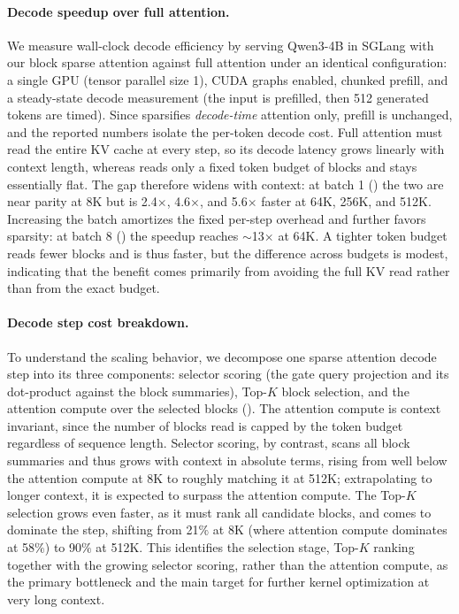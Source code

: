 \paragraph{Decode speedup over full attention.}
We measure wall-clock decode efficiency by serving Qwen3-4B in SGLang with
our block sparse attention against full attention under an identical
configuration: a single GPU (tensor parallel size 1), CUDA graphs enabled,
chunked prefill, and a steady-state decode measurement (the input is prefilled,
then 512 generated tokens are timed).
Since \our sparsifies \emph{decode-time} attention only, prefill is unchanged,
and the reported numbers isolate the per-token decode cost.
Full attention must read the entire KV cache at every step, so its decode
latency grows linearly with context length, whereas \our reads only a fixed
token budget of blocks and stays essentially flat.
The gap therefore widens with context: at batch 1
() the two are near parity at 8K but \our is
2.4$\times$, 4.6$\times$, and 5.6$\times$ faster at 64K, 256K, and 512K.
Increasing the batch amortizes the fixed per-step overhead and further favors
sparsity: at batch 8 () the speedup reaches
$\sim$13$\times$ at 64K.
A tighter token budget reads fewer blocks and is thus faster, but the difference
across budgets is modest, indicating that the benefit
comes primarily from avoiding the full KV read rather than from the exact budget.

\paragraph{Decode step cost breakdown.}
To understand the scaling behavior, we decompose one sparse attention decode
step into its three components: selector scoring (the gate query projection and
its dot-product against the block summaries), Top-$K$ block selection, and the
attention compute over the selected blocks ().
The attention compute is context invariant, since the number of blocks read is
capped by the token budget regardless of sequence length.
Selector scoring, by contrast, scans all block summaries and thus grows with
context in absolute terms, rising from well below the attention compute at 8K
to roughly matching it at 512K; extrapolating to longer context, it is
expected to surpass the attention compute.
The Top-$K$ selection grows even faster, as it must rank all candidate blocks,
and comes to dominate the step, shifting from 21$\%$ at 8K
(where attention compute dominates at 58$\%$) to 90$\%$ at 512K.
This identifies the selection stage, Top-$K$ ranking together with the growing
selector scoring, rather than the attention compute, as the primary bottleneck
and the main target for further kernel optimization at very long context.
